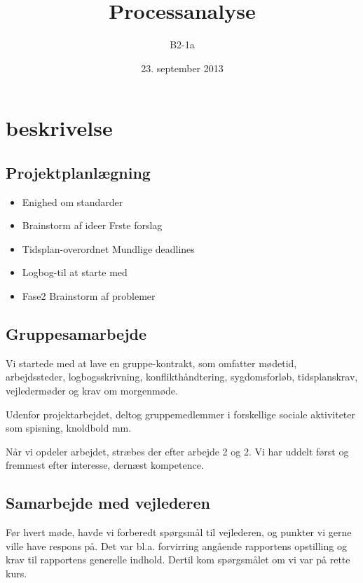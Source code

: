 


\title{Processanalyse}
\author{B2-1a}
\date{23. september 2013}
\maketitle



\section{beskrivelse}

\subsection{Projektplanlægning}
\begin{itemize}
\item Enighed om standarder
\item Brainstorm af ideer
\subitem Frste forslag
\item Tidsplan-overordnet
\subitem Mundlige deadlines
\item Logbog-til at starte med
\item Fase2 Brainstorm af problemer
\end{itemize}

\subsection{Gruppesamarbejde}


Vi startede med at lave en gruppe-kontrakt, som omfatter mødetid, arbejdssteder, logbogsskrivning, konflikthåndtering, sygdomsforløb, tidsplanskrav, vejledermøder og krav om morgenmøde.

Udenfor projektarbejdet, deltog gruppemedlemmer i forskellige sociale aktiviteter som spisning, knoldbold mm.

Når vi opdeler arbejdet, stræbes der efter arbejde 2 og 2. Vi har uddelt først og fremmest efter interesse, dernæst kompetence.

\subsection{Samarbejde med vejlederen}


Før hvert møde, havde vi forberedt spørgsmål til vejlederen, og punkter vi gerne ville have respons på. Det var bl.a. forvirring angående rapportens opstilling og krav til rapportens generelle indhold. Dertil kom spørgsmålet om vi var på rette kurs.

